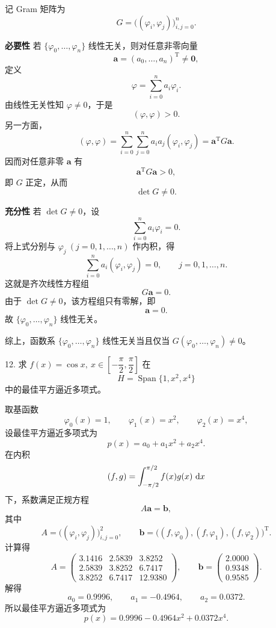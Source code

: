 \documentclass[11pt, a4paper]{ctexart}
\begin{document}
\begin{myproof}
    记 Gram 矩阵为
    \[
        G=\bigl((\varphi_i,\varphi_j)\bigr)_{i,j=0}^{n}.
    \]

    \textbf{必要性} 若 $\{\varphi_0,\ldots,\varphi_n\}$ 线性无关，则对任意非零向量
    \[
        \bm a=(a_0,\ldots,a_n)^{\mathrm T}\neq \bm 0,
    \]
    定义
    \[
        \varphi=\sum_{i=0}^{n}a_i\varphi_i.
    \]
    由线性无关性知 $\varphi\neq 0$，于是
    \[
        (\varphi,\varphi)>0.
    \]
    另一方面，
    \[
        (\varphi,\varphi)=\sum_{i=0}^{n}\sum_{j=0}^{n}a_i a_j(\varphi_i,\varphi_j)
        =\bm a^{\mathrm T}G\bm a.
    \]
    因而对任意非零 $\bm a$ 有
    \[
        \bm a^{\mathrm T}G\bm a>0,
    \]
    即 $G$ 正定，从而
    \[
        \det G\neq 0.
    \]

    \textbf{充分性} 若 $\det G\neq 0$，设
    \[
        \sum_{i=0}^{n}a_i\varphi_i=0.
    \]
    将上式分别与 $\varphi_j\ (j=0,1,\ldots,n)$ 作内积，得
    \[
        \sum_{i=0}^{n}a_i(\varphi_i,\varphi_j)=0,\qquad j=0,1,\ldots,n.
    \]
    这就是齐次线性方程组
    \[
        G\bm a=0.
    \]
    由于 $\det G\neq 0$，该方程组只有零解，即
    \[
        \bm a=0.
    \]
    故 $\{\varphi_0,\ldots,\varphi_n\}$ 线性无关。

    综上，函数系 $\{\varphi_0,\ldots,\varphi_n\}$ 线性无关当且仅当 $G(\varphi_0,\ldots,\varphi_n)\neq 0$。
\end{myproof}


\begin{problem}{12. 求 $f(x)=\cos x,\ x\in\left[-\dfrac{\pi}{2},\dfrac{\pi}{2}\right]$ 在}
    \[
        H=\operatorname{Span}\{1,x^2,x^4\}
    \]
    中的最佳平方逼近多项式。
\end{problem}

\begin{solution}
    取基函数
    \[
        \varphi_0(x)=1,\qquad \varphi_1(x)=x^2,\qquad \varphi_2(x)=x^4,
    \]
    设最佳平方逼近多项式为
    \[
        p(x)=a_0+a_1x^2+a_2x^4.
    \]
    在内积
    \[
        (f,g)=\int_{-\pi/2}^{\pi/2}f(x)g(x)\,\,\mathrm{d} x
    \]
    下，系数满足正规方程
    \[
        A\bm a=\bm b,
    \]
    其中
    \[
        A=\bigl((\varphi_i,\varphi_j)\bigr)_{i,j=0}^{2},\qquad
        \bm b=\bigl((f,\varphi_0),(f,\varphi_1),(f,\varphi_2)\bigr)^{\mathrm T}.
    \]
    计算得
    \[
        A=
        \begin{pmatrix}
            3.1416 & 2.5839 & 3.8252 \\
            2.5839 & 3.8252 & 6.7417 \\
            3.8252 & 6.7417 & 12.9380
        \end{pmatrix},
        \qquad
        \bm b=
        \begin{pmatrix}
            2.0000 \\
            0.9348 \\
            0.9585
        \end{pmatrix}.
    \]
    解得
    \[
        a_0=0.9996,\qquad a_1=-0.4964,\qquad a_2=0.0372.
    \]
    所以最佳平方逼近多项式为
    \[
        p(x)=0.9996-0.4964x^2+0.0372x^4.
    \]
\end{solution}
\end{document}
